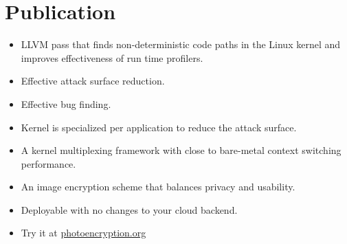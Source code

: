 \documentclass[11pt,a4paper,sans]{moderncv}
\begin{document}
\makecvtitle

\section{Publication}
{
    \begin{itemize}
        \item LLVM pass that finds non-deterministic code paths in the Linux
        kernel and improves effectiveness of run time profilers.
        \item Effective attack surface reduction.
        \item Effective bug finding.
    \end{itemize}
}

{
    \begin{itemize}
        \item Kernel is specialized per application to reduce the attack
        surface.
        \item A kernel multiplexing framework with close to bare-metal context
        switching performance.
    \end{itemize}
}

{
    \begin{itemize}
    \item An image encryption scheme that balances privacy and usability.
    \item Deployable with no changes to your cloud backend.
    \item Try it at \href{https://photoencryption.org}{photoencryption.org}
    \end{itemize}
}

\end{document}
